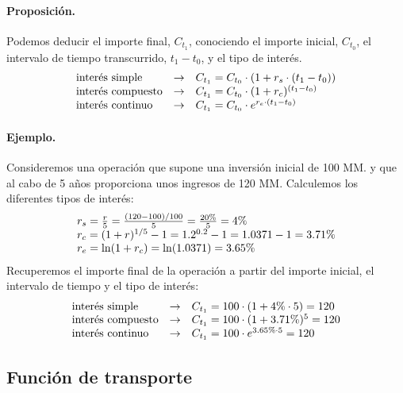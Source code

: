 \paragraph{Proposici\'on.}
Podemos deducir el importe final, $C_{t_1}$, conociendo el importe inicial, 
$C_{t_0}$, el intervalo de tiempo transcurrido, $t_1 - t_0$, y el tipo de 
inter\'es.
\begin{displaymath}
\begin{array}{lcl}
\textrm{inter\'es simple}    & \rightarrow & C_{t_1} = C_{t_0} \cdot (1+ r_s \cdot (t_1-t_0)) \cr
\textrm{inter\'es compuesto} & \rightarrow & C_{t_1} = C_{t_0} \cdot (1+ r_c)^{(t_1-t_0)}      \cr
\textrm{inter\'es continuo}  & \rightarrow & C_{t_1} = C_{t_0} \cdot e^{r_e \cdot (t_1-t_0)} 
\end{array}
\end{displaymath}

\paragraph{Ejemplo.}
Consideremos una operaci\'on que supone una inversi\'on inicial de 100 MM. y que 
al cabo de 5 a\~{n}os proporciona unos ingresos de 120 MM. 
\newline
\newline
Calculemos los diferentes tipos de inter\'es:
\begin{displaymath}
\begin{array}{l}
r_s= \frac{r}{5} = \frac{(120-100)/100}{5} = \frac{20\%}{5} = 4\% \cr
r_c= (1+r) ^ {1/5} - 1 = 1.2^{0.2} - 1 = 1.0371 - 1 = 3.71 \%       \cr
r_e= \ln(1 + r_c) = \ln(1.0371) = 3.65 \%
\end{array}
\end{displaymath}
\newline
\newline
Recuperemos el importe final de la operaci\'on a partir del importe inicial, 
el intervalo de tiempo y el tipo de inter\'es:
\begin{displaymath}
\begin{array}{lcl}
\textrm{inter\'es simple}    & \rightarrow & C_{t_1} = 100 \cdot (1 + 4\% \cdot 5) = 120 \cr
\textrm{inter\'es compuesto} & \rightarrow & C_{t_1} = 100 \cdot (1 + 3.71\%)^5 = 120 \cr
\textrm{inter\'es continuo}  & \rightarrow & C_{t_1} = 100 \cdot e^{3.65 \% \cdot 5} = 120
\end{array}
\end{displaymath}

\subsection{Funci\'on de transporte}

